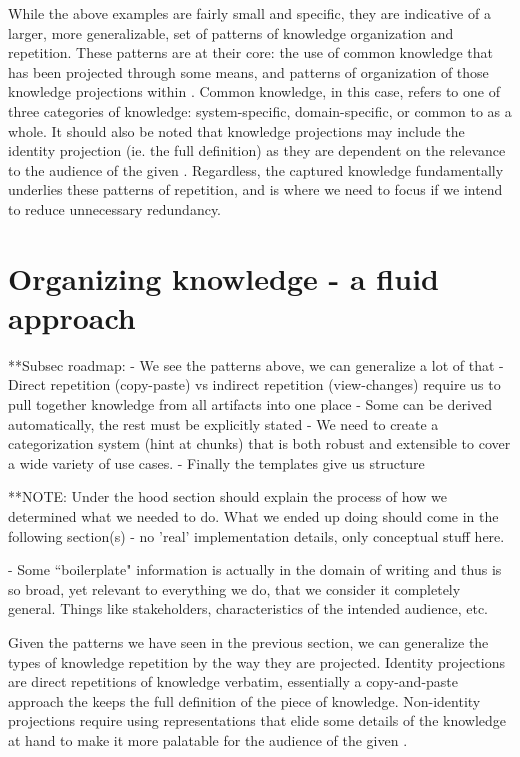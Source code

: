While the above examples are fairly small and specific, they are indicative of 
a larger, more generalizable, set of patterns of knowledge organization and 
repetition. These patterns are at their core: the use of common knowledge that 
has been projected through some means, and patterns of organization of those 
knowledge projections within \sfs{}. Common knowledge, in this case, refers to 
one of three categories of knowledge: system-specific, domain-specific, or 
common to \sfs{} as a whole. It should also be noted that knowledge projections 
may include the identity projection (ie. the full definition) as they are 
dependent on the relevance to the audience of the given \sf{}. Regardless, the 
captured knowledge fundamentally underlies these patterns of repetition, and is 
where we need to focus if we intend to reduce unnecessary redundancy.

\section{Organizing knowledge - a fluid approach}
  **Subsec roadmap:
    - We see the patterns above, we can generalize a lot of that
    - Direct repetition (copy-paste) vs indirect repetition (view-changes)
    require us to pull together knowledge from all artifacts into one place
    - Some can be derived automatically, the rest must be explicitly stated
    - We need to create a categorization system (hint at chunks) that is both
    robust and extensible to cover a wide variety of use cases.
    - Finally the templates give us structure

  **NOTE: Under the hood section should explain the process of how we determined
  what we needed to do. What we ended up doing should come in the following
  section(s) - no 'real' implementation details, only conceptual stuff here.

- Some ``boilerplate" information is actually in the domain of \sf{} writing 
and 
thus is so broad, yet relevant to everything we do, that we consider it 
completely general. Things like stakeholders, characteristics of the intended 
audience, etc.

Given the patterns we have seen in the previous section, we can generalize the 
types of knowledge repetition by the way they are projected. Identity 
projections are direct repetitions of knowledge verbatim, essentially a 
copy-and-paste approach the keeps the full definition of the piece of 
knowledge. Non-identity projections require using representations that elide 
some details of the knowledge at hand to make it more palatable for the 
audience of the given \sf{}. 

